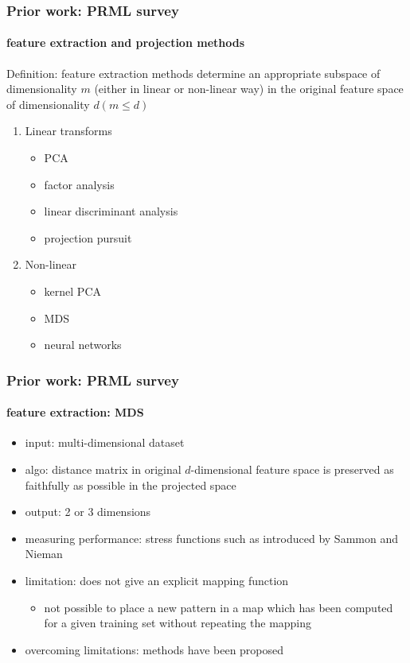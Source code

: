 \begin{frame}
\frametitle{Prior work: PRML survey}
\framesubtitle{feature extraction and projection methods}
\mypagenum
{}
	{\color{red} Definition}: feature extraction methods determine an appropriate subspace of dimensionality $m$ (either in linear or non-linear way) in the original feature space of dimensionality $d (m \leq d)$ 
	\vspace{0.1in}
	\begin{enumerate}
		\item Linear transforms
			\begin{itemize}
				\item PCA
				\item factor analysis
				\item linear discriminant analysis
				\item projection pursuit
			\end{itemize}
		\item Non-linear
			\begin{itemize}
				\item kernel PCA
				\item MDS
				\item neural networks
			\end{itemize}
	\end{enumerate}
\end{frame}



\begin{frame}
\frametitle{Prior work: PRML survey}
\framesubtitle{feature extraction: MDS}
\logoCSIPCPL\mypagenum	
{}
	\begin{itemize}
		\item input: multi-dimensional dataset
		\item algo: distance matrix in original $d$-dimensional feature space is preserved as faithfully as possible in the projected space
		\item output: 2 or 3 dimensions
		\item measuring performance: stress functions such as introduced by Sammon and Nieman
		\item limitation: does not give an explicit mapping function 
			\begin{itemize}
				\item not possible to place a new pattern in a map which has been computed for a given training set without repeating the mapping
			\end{itemize}
		\item overcoming limitations: methods have been proposed
	\end{itemize}
\end{frame}


